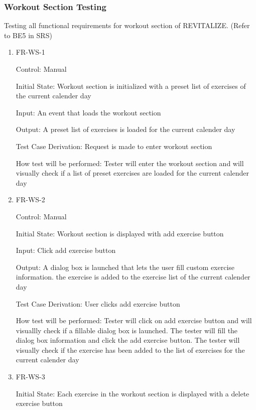 \documentclass[12pt, titlepage]{article}
\begin{document}
\subsubsection{Workout Section Testing}

Testing all functional requirements for workout section of REVITALIZE. (Refer to BE5 in SRS)

\begin{enumerate}

\item{FR-WS-1\\}

Control: Manual
					
Initial State: Workout section is initialized with a preset list of exercises of the current calender day
					
Input: An event that loads the workout section
					
Output: A preset list of exercises is loaded for the current calender day

Test Case Derivation: Request is made to enter workout section

How test will be performed: Tester will enter the workout section and will visually check if a list of preset exercises are loaded for the current calender day
					
\item{FR-WS-2 \\}

Control: Manual
					
Initial State: Workout section is displayed with add exercise button
					
Input: Click add exercise button
					
Output: A dialog box is launched that lets the user fill custom exercise information. the exercise is added to the exercise list of the current calender day

Test Case Derivation: User clicks add exercise button

How test will be performed: Tester will click on add exercise button and will visuallly check if a fillable dialog box is launched. The tester will fill the dialog box information and click the add exercise button. The tester will visually check if the exercise has been added to the list of exercises for the current calender day

\item{FR-WS-3\\}

Initial State: Each exercise in the workout section is displayed with a delete exercise button
					

\end{enumerate}
\end{document}
